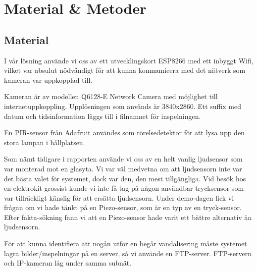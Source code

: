 



\chapter{Material \& Metoder} %
\label{ch:metoder}


\ifpdf
    \graphicspath{{8/figures/PNG/}{8_materials_and_methods/figures/PDF/}{8_materials_and_methods/figures/}}
\else
    \graphicspath{{8/figures/EPS/}{8_materials_and_methods/figures/}}
\fi


\section{Material}
I vår lösning använde vi oss av ett utvecklingskort ESP8266 med ett inbyggt Wifi, vilket var absulut nödvändigt för att kunna kommunicera med det nätverk som kameran var uppkopplad till.

Kameran är av modellen Q6128-E Network Camera med möjlighet till internetuppkoppling. Upplösningen som används är 3840x2860. Ett suffix med datum och tidsinformation läggs till i filnamnet för inspelningen.

En PIR-sensor från Adafruit användes som rörelsedetektor för att lysa upp den stora lampan i hållplatsen.

Som nämt tidigare i rapporten använde vi oss av en helt vanlig ljudsensor som var monterad mot en glasyta. Vi var väl medvetna om att ljudsensorn inte var det bästa valet för systemet, dock var den, den mest tillgängliga. Vid besök hos en elektrokit-grossist kunde vi inte få tag på någon användbar trycksensor som var tillräckligt känslig för att ersätta ljudsensorn. Under demo-dagen fick vi frågan om vi hade tänkt på en Piezo-sensor, som är en typ av en tryck-sensor. Efter fakta-sökning fann vi att en Piezo-sensor hade varit ett bättre alternativ än ljudsensorn.

För att kunna identifiera att nogån utför en begår vandalisering måste systemet lagra bilder/inspelningar på en server, så vi använde en FTP-server. FTP-servern och IP-kameran låg under samma subnät.\\

